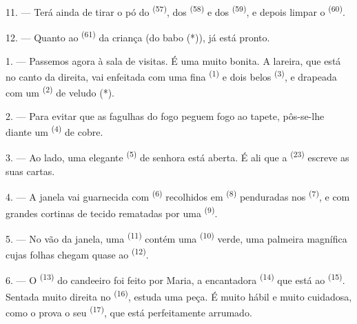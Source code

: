 11. --- Terá ainda de tirar o pó do 
\textsuperscript{(57)}, dos  \textsuperscript{(58)} e dos
 \textsuperscript{(59)}, e depois limpar o 
\textsuperscript{(60)}.

12. --- Quanto ao  \textsuperscript{(61)} da criança (do babo (*)),
já está pronto.

\VUsaut{5.0mm}
\VUsaut{3.0mm}

1. --- Passemos agora à sala de visitas. É uma  muito bonita. A
lareira, que está no canto da direita, vai enfeitada com uma fina
 \textsuperscript{(1)} e dois belos 
\textsuperscript{(3)}, e drapeada com um  \textsuperscript{(2)} de
veludo (*).

2. --- Para evitar que as fagulhas do fogo peguem fogo ao tapete,
pôs-se-lhe diante um  \textsuperscript{(4)} de cobre.

3. --- Ao lado, uma elegante  \textsuperscript{(5)} de
senhora está aberta. É ali que a  \textsuperscript{(23)}
escreve as suas cartas.

4. --- A janela vai guarnecida com  \textsuperscript{(6)}
recolhidos em  \textsuperscript{(8)} penduradas nos
 \textsuperscript{(7)}, e com grandes cortinas de tecido rematadas
por uma  \textsuperscript{(9)}.

5. --- No vão da janela, uma  \textsuperscript{(11)} contém uma
 \textsuperscript{(10)} verde, uma palmeira magnífica cujas folhas
chegam quase ao  \textsuperscript{(12)}.

6. --- O  \textsuperscript{(13)} do candeeiro foi feito por
Maria, a encantadora  \textsuperscript{(14)} que está ao
 \textsuperscript{(15)}. Sentada muito direita no 
\textsuperscript{(16)}, estuda uma peça. É muito hábil e muito cuidadosa, como o
prova o seu  \textsuperscript{(17)}, que está
perfeitamente arrumado.

\VUsaut{5.0mm}
\VUsaut{3.0mm}


